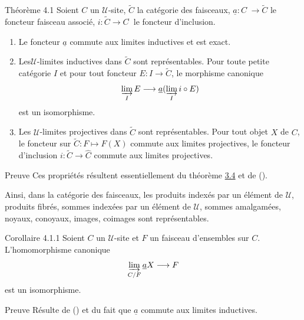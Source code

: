 \documentclass[10pt]{../fichiers-configuration-latex/smfart}
\begin{document}
\begin{enonce*}{Théorème 4.1}
Soient $C$ un $𝒰$-site, $\widetilde{C}$ la catégorie des
faisceaux, $\underline{a}:C^{\widehat{\phantom{,}}}\rightarrow
\widetilde{C}$ le foncteur faisceau associé,
$i:\widetilde{C}\rightarrow C^{\widehat{\phantom{,}}}$ le foncteur
d'inclusion.
\begin{enumerate}
\renewcommand{\labelenumi}{\theenumi)}
\item Le foncteur $\underline{a}$ commute aux limites inductives et est exact.

\item Les\pageoriginale $𝒰$-limites inductives dans
$\widetilde{C}$ sont
  représentables. Pour toute petite catégorie $I$ et pour tout
  foncteur $E:I\rightarrow \widetilde{C}$, le morphisme canonique
$$
\varinjlim_I E\longrightarrow \underline{a}(\varinjlim_I i\circ E)
$$
est un isomorphisme.

\item Les $𝒰$-limites projectives dans $\widetilde{C}$ sont
  représentables. Pour tout objet $X$ de $C$, le foncteur sur
  $\widetilde{C}:F\mapsto F(X)$ commute aux limites projectives, \ie
  le foncteur d'inclusion $i:\widetilde{C}\rightarrow \widehat{C}$
  commute aux limites projectives.
\end{enumerate}
\end{enonce*}

\begin{enonce*}[remark]{Preuve}
Ces propriétés résultent essentiellement du théorème
\hyperref[II.theo3.4]{3.4} et de ().
\end{enonce*}

Ainsi, dans la catégorie des faisceaux, les produits indexés par
un élément de $𝒰$, produits fibrés, sommes indexées
par un élément de $𝒰$, sommes amalgamées, noyaux,
conoyaux, images, coimages sont représentables.

\begin{enonce*}{Corollaire 4.1.1}
Soient $C$ un $𝒰$-site et $F$ un faisceau d'ensembles sur
$C$. L'homomorphisme canonique
$$
\varinjlim_{C/F} \underline{a}X\longrightarrow F
$$
est un isomorphisme.
\end{enonce*}

\begin{enonce*}[remark]{Preuve}
Résulte de () et du fait que $\underline{a}$ commute
aux limites inductives.
\end{enonce*}
\end{document}
